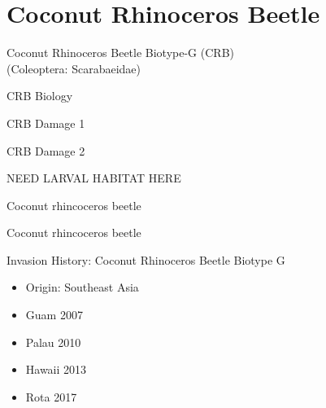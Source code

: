 \documentclass[]{beamer}
\begin{document}



\section{Coconut Rhinoceros Beetle}

\begin{frame}{Coconut Rhinoceros Beetle Biotype-G (CRB)\\(Coleoptera: Scarabaeidae)}
\end{frame}

\begin{frame}{CRB Biology}
\end{frame}

\begin{frame}{CRB Damage 1}
\end{frame}

\begin{frame}{CRB Damage 2}
\end{frame}

\begin{frame}
	NEED LARVAL HABITAT HERE
\end{frame}

\begin{frame}{Coconut rhincoceros beetle}
\end{frame}

\begin{frame}{Coconut rhincoceros beetle}
\end{frame}


\begin{frame}{Invasion History: Coconut Rhinoceros Beetle Biotype G}
	\begin{itemize}
		\item Origin: Southeast Asia
		\item Guam 2007
		\item Palau 2010
		\item Hawaii 2013
		\item Rota 2017
	\end{itemize}
\end{frame}
\end{document}
